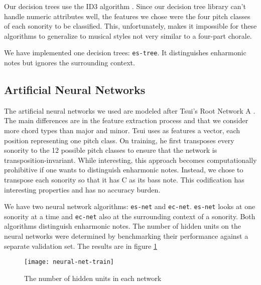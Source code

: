 \documentclass{article}
\newcommand{\comment}[1]{}
\begin{document}
\comment{
  ==> ID3 algorithm
  ==> features: sequência de pitches
  ==> dependência em quatro vozes 
}

Our decision trees use the ID3 algorithm
\cite{mitchell:machine}. Since our decision tree library can't handle
numeric attributes well, the features we chose were the four pitch
classes of each sonority to be classified. This, unfortunately,
makes it impossible for these algorithms to generalize to musical
styles not very similar to a four-part chorale.

We have implemented one decision trees: \texttt{es-tree}. It
distinguishes enharmonic notes but ignores the surrounding context.

\subsection{Artificial Neural Networks}
\label{sec:neural-net}

\comment{
  ==> features são weighted pitch counts
  ==> simple/enharmonic-simple/context
  ==> mostrar gráfico de hidden units
}

The artificial neural networks we used are modeled after Tsui's Root
Network A \cite{tsui:harmonic}. The main differences are in the
feature extraction process and that we consider more chord types than
major and minor. Tsui \cite{tsui:harmonic} uses as features a vector,
each position representing one pitch class. On training, he first
transposes every sonority to the 12 possible pitch classes to ensure
that the network is transposition-invariant. While interesting, this
approach becomes computationally prohibitive if one wants to
distinguish enharmonic notes. Instead, we chose to transpose each
sonority so that it has C as its bass note. This codification has
interesting properties and has no accuracy burden.

We have two neural network algorithms: \texttt{es-net} and
\texttt{ec-net}.  \texttt{es-net} looks at one sonority at a time and
\texttt{ec-net} also at the surrounding context of a sonority. Both
algorithms distinguish enharmonic notes. The number of hidden units on
the neural networks were determined by benchmarking their performance
against a separate validation set. The results are in figure
\ref{fig:hidden-units}

\begin{figure}
  \centering
  \texttt{[image: neural-net-train]}
  \caption{The number of hidden units in each network}
  \label{fig:hidden-units}
\end{figure}
\end{document}
